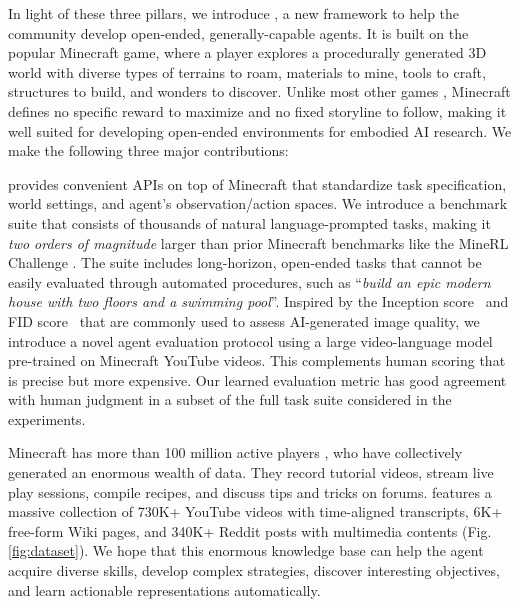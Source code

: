 In light of these three pillars, we introduce \minedojo, a new framework to help the community develop open-ended, generally-capable agents. It is built on the popular Minecraft game, where a player explores a procedurally generated 3D world with diverse types of terrains to roam, materials to mine, tools to craft, structures to build, and wonders to discover. 
Unlike most other games \cite{mnih2013playing, openai2019dota, vinyals2019alphastar}, Minecraft defines no specific reward to maximize and no fixed storyline to follow, making it well suited for developing open-ended environments for embodied AI research. 
We make the following three major contributions: 

\minedojo provides convenient APIs on top of Minecraft that standardize task specification, world settings, and agent's observation/action spaces. We introduce a benchmark suite that consists of thousands of natural language-prompted tasks, making it \textit{two orders of magnitude} larger than prior Minecraft benchmarks like the MineRL Challenge \cite{guss2019minerl,kanervisto2022minerl}. 
The suite includes long-horizon, open-ended tasks that cannot be easily evaluated through automated procedures, such as ``\textit{build an epic modern house with two floors and a swimming pool}''. %
Inspired by the Inception score~\cite{DBLP:conf/nips/SalimansGZCRCC16} and FID score~\cite{DBLP:conf/nips/HeuselRUNH17} that are commonly used to assess AI-generated image quality, we introduce a novel agent evaluation protocol using a large video-language model pre-trained on Minecraft YouTube videos. 
This complements human scoring \cite{shah2021basalt} that is precise but more expensive. 
Our learned evaluation metric has good agreement with human judgment in a subset of the full task suite considered in the experiments.

 Minecraft has more than 100 million active players \cite{enwiki:1092238294}, who have collectively generated an enormous wealth of data. They record tutorial videos, stream live play sessions, compile recipes, and discuss tips and tricks on forums. \minedojo features a massive collection of 730K+ YouTube videos with time-aligned transcripts, 6K+ free-form Wiki pages, and 340K+ Reddit posts with multimedia contents (Fig. \ref{fig:dataset}). We hope that this enormous knowledge base can help the agent acquire diverse skills, develop complex strategies, discover interesting objectives,  and learn actionable representations automatically.

